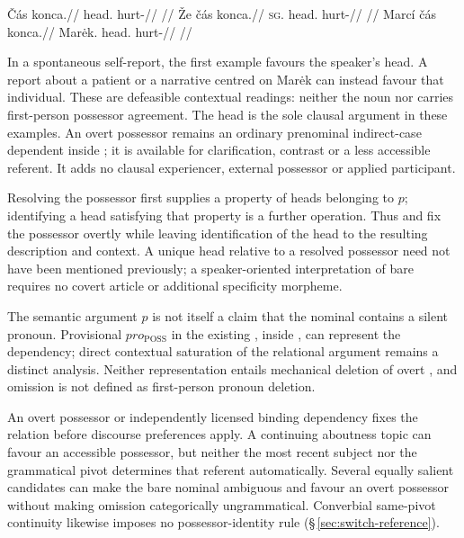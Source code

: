 \pex\label{ex:nm-implicit-poss}
\a
\begingl
\gla Čás konca.//
\glb head.\Dir{} hurt-\Cont{}//
\glft {}
//
\endgl
\a
\begingl
\gla Že čás konca.//
\textsc{sg}.\Ind{} head.\Dir{} hurt-\Cont{}//
\glft {} //
\endgl
\a
\begingl
\gla Marcí čás konca.//
\glb Marėk.\Ind{} head.\Dir{} hurt-\Cont{}//
\glft {} //
\endgl
\xe

In a spontaneous self-report, the first example favours the speaker's head.
A report about a patient or a narrative centred on Marėk can instead favour
that individual. These are defeasible contextual readings: neither the noun
nor  carries first-person possessor agreement. The head is the
sole clausal argument in these examples. An overt possessor remains an
ordinary prenominal indirect-case dependent inside ; it is
available for clarification, contrast or a less accessible referent. It adds
no clausal experiencer, external possessor or applied participant.

Resolving the possessor first supplies a property of heads belonging to
\(p\); identifying a head satisfying that property is a further operation.
Thus  and  fix the possessor overtly while
leaving identification of the head to the resulting description and context.
A unique head relative to a resolved possessor need not have been mentioned
previously; a speaker-oriented interpretation of bare  requires no
covert article or additional specificity morpheme.

The semantic argument \(p\) is not itself a claim that the nominal
contains a silent pronoun. Provisional \(pro_{\mathrm{POSS}}\) in the
existing , inside , can represent the dependency;
direct contextual saturation of the relational argument remains a distinct
analysis. Neither representation entails mechanical deletion of overt
, and omission is not defined as first-person pronoun deletion.

An overt possessor or independently licensed binding dependency fixes the
relation before discourse preferences apply. A continuing aboutness topic
can favour an accessible possessor, but neither the most recent subject nor
the grammatical pivot determines that referent automatically. Several equally
salient candidates can make the bare nominal ambiguous and favour an overt
possessor without making omission categorically ungrammatical.
Converbial same-pivot continuity likewise imposes no possessor-identity rule
(§\,\ref{sec:switch-reference}).

